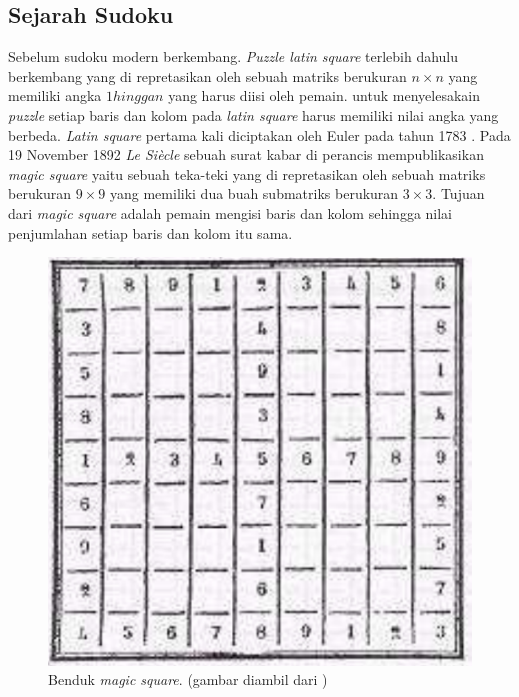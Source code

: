 \subsection{Sejarah Sudoku}

Sebelum sudoku modern berkembang. \textit{Puzzle latin square} terlebih dahulu berkembang yang di repretasikan oleh sebuah matriks berukuran ${n \times n}$ yang memiliki angka ${1 hingga n}$ yang harus diisi oleh pemain. untuk menyelesakain \textit{puzzle }setiap baris dan kolom pada \textit{latin square} harus memiliki nilai angka yang berbeda. \textit{Latin square} pertama kali diciptakan oleh Euler pada tahun 1783 \cite{Unk1}. Pada 19 November 1892 \textit{ Le Siècle} sebuah surat kabar di perancis mempublikasikan \textit{magic square} yaitu sebuah teka-teki  yang di repretasikan oleh sebuah matriks berukuran ${9 \times 9}$ yang memiliki dua buah submatriks berukuran ${3 \times 3}$. Tujuan dari \textit{magic square} adalah pemain mengisi baris dan kolom sehingga nilai penjumlahan setiap baris dan kolom itu sama. 

\begin{figure}[H]
	\begin{centering}
		\includegraphics[scale=0.7]{gambar/magicSquare}
		
		\caption{Benduk \textit{magic square}. (gambar diambil dari \cite{SATPy4})}
	\end{centering}
\end{figure}


